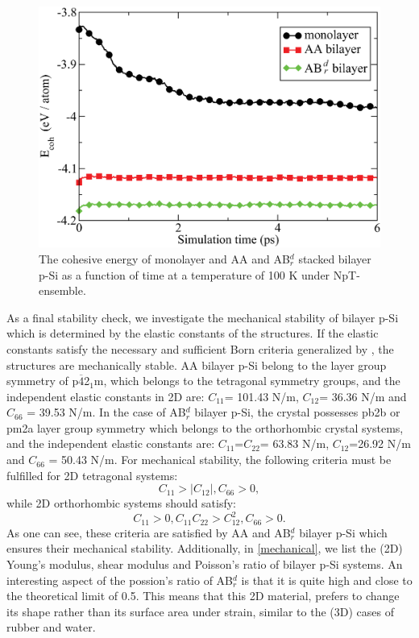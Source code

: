 \begin{figure}[htbp]
\centering
\includegraphics[width=0.7\linewidth]{ps_ab_initio_MD_100K.eps}%
\caption{The cohesive energy of monolayer and AA and AB$_r^d$ stacked bilayer p-Si as a function of time at a temperature of 100 K under NpT-ensemble. \label{fig:ps_MD}}
\end{figure}

As a final stability check, we investigate the mechanical stability of bilayer p-Si which is determined by the elastic constants of the structures. If the elastic constants satisfy the necessary and sufficient Born criteria generalized by \citet{Mouhat2014}, the structures are mechanically stable. AA bilayer p-Si belong to the layer group symmetry of p$\overline{4}$2$_1$m, which belongs to the tetragonal symmetry groups, and the independent elastic constants in 2D are: $C_{11}$= 101.43 N/m, $C_{12}$= 36.36 N/m and $C_{66}$ = 39.53  N/m. In the case of AB$_r^d$ bilayer p-Si, the crystal possesses pb2b or pm2a layer group symmetry which belongs to the orthorhombic crystal systems, and the independent elastic constants are: $C_{11}$=$C_{22}$= 63.83 N/m, $C_{12}$=26.92 N/m and $C_{66}$ = 50.43 N/m.  For mechanical stability, the following criteria must be fulfilled for 2D tetragonal systems:
\begin{equation}
C_{11}>|C_{12}|, C_{66}>0,
\end{equation}
while 2D orthorhombic systems should satisfy:
\begin{equation}
C_{11}>0,C_{11}C_{22}>C_{12}^2, C_{66}>0.
\end{equation}
As one can see, these criteria are satisfied by AA and AB$_r^d$ bilayer p-Si which ensures their mechanical stability. Additionally, in \autoref{mechanical}, we list the  (2D) Young's modulus, shear modulus and Poisson's ratio of bilayer p-Si systems. An interesting aspect of the possion's ratio of AB$_r^d$ is that it is quite high and close to the theoretical limit of 0.5. This means that this 2D material, prefers to change its shape rather than its surface area under strain, similar to the (3D) cases of rubber and water.

